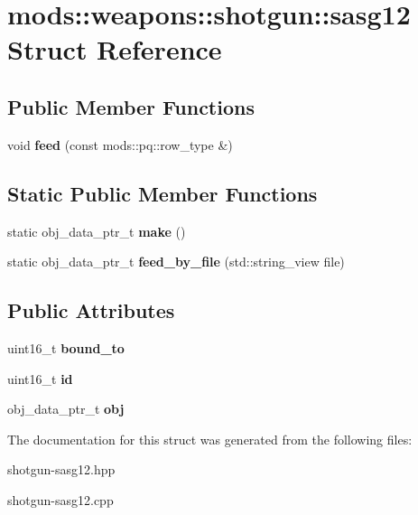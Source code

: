 \hypertarget{structmods_1_1weapons_1_1shotgun_1_1sasg12}{}\section{mods\+:\+:weapons\+:\+:shotgun\+:\+:sasg12 Struct Reference}
\label{structmods_1_1weapons_1_1shotgun_1_1sasg12}
\subsection*{Public Member Functions}
\begin{DoxyCompactItemize}
\item 
\mbox{\label{structmods_1_1weapons_1_1shotgun_1_1sasg12_aa8c304b9646f152fe3f6b94f5da32dd1}} 
void {\bfseries feed} (const mods\+::pq\+::row\+\_\+type \&)
\end{DoxyCompactItemize}
\subsection*{Static Public Member Functions}
\begin{DoxyCompactItemize}
\item 
\mbox{\label{structmods_1_1weapons_1_1shotgun_1_1sasg12_aa12808cb24e4bc2193ebb38a7dc8d753}} 
static obj\+\_\+data\+\_\+ptr\+\_\+t {\bfseries make} ()
\item 
\mbox{\label{structmods_1_1weapons_1_1shotgun_1_1sasg12_a07b41f5f0a8bef812306f9a454033d00}} 
static obj\+\_\+data\+\_\+ptr\+\_\+t {\bfseries feed\+\_\+by\+\_\+file} (std\+::string\+\_\+view file)
\end{DoxyCompactItemize}
\subsection*{Public Attributes}
\begin{DoxyCompactItemize}
\item 
\mbox{\label{structmods_1_1weapons_1_1shotgun_1_1sasg12_af4f208c9bd4efcd64d2ab7a9ec20b927}} 
uint16\+\_\+t {\bfseries bound\+\_\+to}
\item 
\mbox{\label{structmods_1_1weapons_1_1shotgun_1_1sasg12_a9b1cc614f46b1aaaf21b9922106a5366}} 
uint16\+\_\+t {\bfseries id}
\item 
\mbox{\label{structmods_1_1weapons_1_1shotgun_1_1sasg12_a425654b9598982b7f6222734d7aae358}} 
obj\+\_\+data\+\_\+ptr\+\_\+t {\bfseries obj}
\end{DoxyCompactItemize}


The documentation for this struct was generated from the following files\+:\begin{DoxyCompactItemize}
\item 
shotgun-\/sasg12.\+hpp\item 
shotgun-\/sasg12.\+cpp\end{DoxyCompactItemize}
